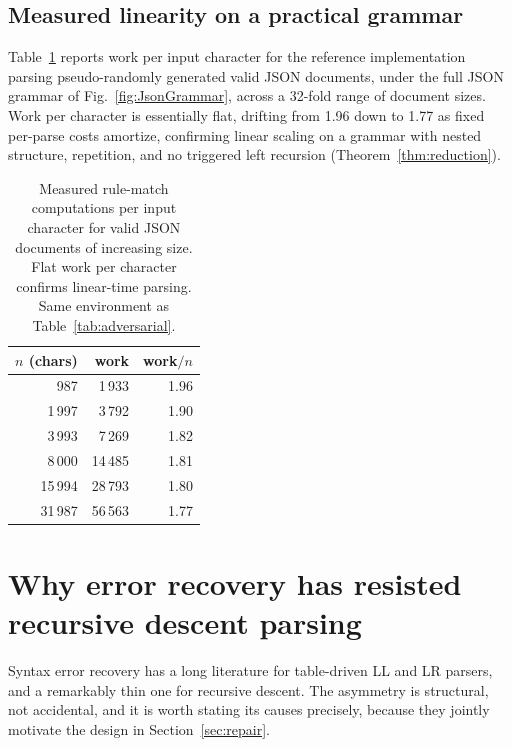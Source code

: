\documentclass[manuscript]{acmart}
\begin{document}
\subsection{Measured linearity on a practical grammar}
\label{sec:measuredlinearity}

Table~\ref{tab:jsonlinearity} reports work per input character for the reference implementation parsing pseudo-randomly generated valid JSON documents, under the full JSON grammar of Fig.~\ref{fig:JsonGrammar}, across a 32-fold range of document sizes. Work per character is essentially flat, drifting from 1.96 down to 1.77 as fixed per-parse costs amortize, confirming linear scaling on a grammar with nested structure, repetition, and no triggered left recursion (Theorem~\ref{thm:reduction}).

\begin{table}[tbp]
\centering
{\small
\begin{tabular}{rrr}\toprule
$n$ (chars) & work & work$/n$ \\\midrule
   987 &  1\,933 & 1.96 \\
 1\,997 &  3\,792 & 1.90 \\
 3\,993 &  7\,269 & 1.82 \\
 8\,000 & 14\,485 & 1.81 \\
15\,994 & 28\,793 & 1.80 \\
31\,987 & 56\,563 & 1.77 \\\bottomrule
\end{tabular}
}
\caption{\label{tab:jsonlinearity}Measured rule-match computations per input character for valid JSON documents of increasing size. Flat work per character confirms linear-time parsing. Same environment as Table~\ref{tab:adversarial}.}
\end{table}

\section{Why error recovery has resisted recursive descent parsing}
\label{sec:whyhard}

Syntax error recovery has a long literature for table-driven LL and LR parsers, and a remarkably thin one for recursive descent. The asymmetry is structural, not accidental, and it is worth stating its causes precisely, because they jointly motivate the design in Section~\ref{sec:repair}.
\end{document}
